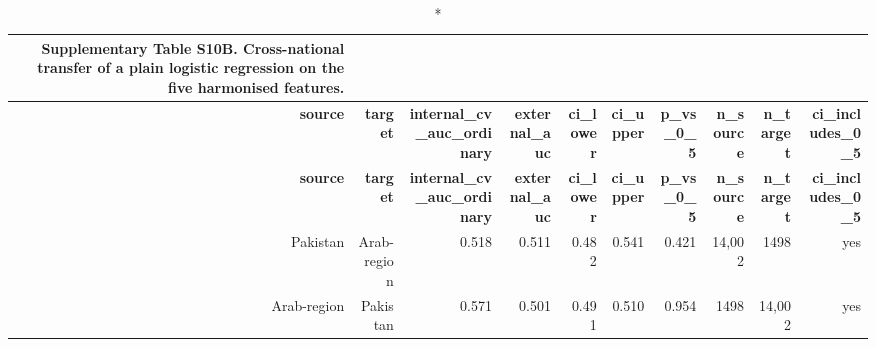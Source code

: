 \documentclass[10pt]{article}
\begin{document}
\tiny
\setlength{\tabcolsep}{2pt}
\begin{longtable}{rrrrrrrrrr}
\caption*{\textbf{Supplementary Table S10B.} Cross-national transfer of a plain logistic regression on the five harmonised features.}\\
\toprule
\textbf{source} & \textbf{target} & \textbf{internal\_cv\_auc\_ordinary} & \textbf{external\_auc} & \textbf{ci\_lower} & \textbf{ci\_upper} & \textbf{p\_vs\_0\_5} & \textbf{n\_source} & \textbf{n\_target} & \textbf{ci\_includes\_0\_5} \\
\midrule
\endfirsthead
\toprule
\textbf{source} & \textbf{target} & \textbf{internal\_cv\_auc\_ordinary} & \textbf{external\_auc} & \textbf{ci\_lower} & \textbf{ci\_upper} & \textbf{p\_vs\_0\_5} & \textbf{n\_source} & \textbf{n\_target} & \textbf{ci\_includes\_0\_5} \\
\midrule
\endhead
\bottomrule
\endfoot
Pakistan & Arab-region & 0.518 & 0.511 & 0.482 & 0.541 & 0.421 & 14{,}002 & 1498 & yes \\
Arab-region & Pakistan & 0.571 & 0.501 & 0.491 & 0.510 & 0.954 & 1498 & 14{,}002 & yes \\
\bottomrule
\end{longtable}
\normalsize
\end{document}
